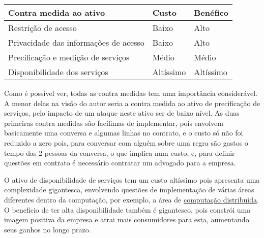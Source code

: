 \documentclass[
    openany,
    12pt,               %
    twoside,            %
    a4paper,            %
    english,            %
    brazil,             %
    ]{abntex2}
\begin{document}
\begin{table}[htbp]
\centering
\begin{tabular}{|l|l|l|}
\hline
\textbf{Contra medida ao ativo} & \textbf{Custo} & \textbf{Benéfico}  \\ \hline
Restrição de acesso & Baixo & Alto  \\ \hline
Privacidade das informações de acesso & Baixo & Alto  \\ \hline
Precificação e medição de serviços & Médio & Médio  \\ \hline
Disponibilidade dos serviços & Altíssimo & Altíssimo \\ \hline
\end{tabular}
\end{table}

Como é possível ver, todas as contra medidas tem uma importância considerável. A menor delas na visão do autor seria a contra medida ao ativo de precificação de serviços, pelo impacto de um ataque neste ativo ser de baixo nível. As duas primeiras contra medidas são facílimas de implementar, pois envolvem basicamente uma conversa e algumas linhas no contrato, e o custo só não foi reduzido a zero pois, para conversar com alguém sobre uma regra são gastos o tempo das 2 pessoas da conversa, o que implica num custo, e, para definir questões em contrato é necessário contratar um advogado para a empresa.

O ativo de disponibilidade de serviços tem um custo altíssimo pois apresenta uma complexidade gigantesca, envolvendo questões de implementação de várias áreas diferentes dentro da computação, por exemplo, a área de \href{https://www.ibm.com/docs/en/txseries/8.1.0?topic=overview-what-is-distributed-computing}{computação distribuída}. O beneficio de ter alta disponibilidade também é gigantesco, pois constrói uma imagem positiva da empresa e atrai mais consumidores para esta, aumentando seus ganhos no longo prazo.

% 

\postextual

% 
\end{document}
